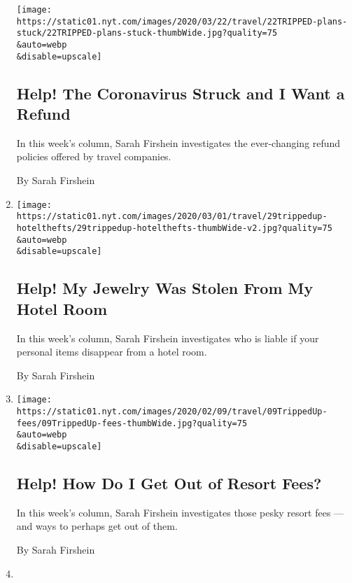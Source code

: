 \begin{enumerate}
  \texttt{[image: https://static01.nyt.com/images/2020/03/22/travel/22TRIPPED-plans-stuck/22TRIPPED-plans-stuck-thumbWide.jpg?quality=75\\\&auto=webp\\\&disable=upscale]}

  \hypertarget{help-the-coronavirus-struck-and-i-want-a-refund}{%
  \subsection{Help! The Coronavirus Struck and I Want a
  Refund}\label{help-the-coronavirus-struck-and-i-want-a-refund}}

  In this week's column, Sarah Firshein investigates the ever-changing
  refund policies offered by travel companies.

  By Sarah Firshein
\item
  \href{/2020/02/29/travel/travel-advice-jewelry-stolen-hotels.html}{}

  \texttt{[image: https://static01.nyt.com/images/2020/03/01/travel/29trippedup-hotelthefts/29trippedup-hotelthefts-thumbWide-v2.jpg?quality=75\\\&auto=webp\\\&disable=upscale]}

  \hypertarget{help-my-jewelry-was-stolen-from-my-hotel-room}{%
  \subsection{Help! My Jewelry Was Stolen From My Hotel
  Room}\label{help-my-jewelry-was-stolen-from-my-hotel-room}}

  In this week's column, Sarah Firshein investigates who is liable if
  your personal items disappear from a hotel room.

  By Sarah Firshein
\item
  \href{/2020/02/08/travel/resort-fees.html}{}

  \texttt{[image: https://static01.nyt.com/images/2020/02/09/travel/09TrippedUp-fees/09TrippedUp-fees-thumbWide.jpg?quality=75\\\&auto=webp\\\&disable=upscale]}

  \hypertarget{help-how-do-i-get-out-of-resort-fees}{%
  \subsection{Help! How Do I Get Out of Resort
  Fees?}\label{help-how-do-i-get-out-of-resort-fees}}

  In this week's column, Sarah Firshein investigates those pesky resort
  fees --- and ways to perhaps get out of them.

  By Sarah Firshein
\item
  \href{/2019/12/28/travel/4-ways-to-travel-better-in-2020.html}{}


\end{enumerate}
